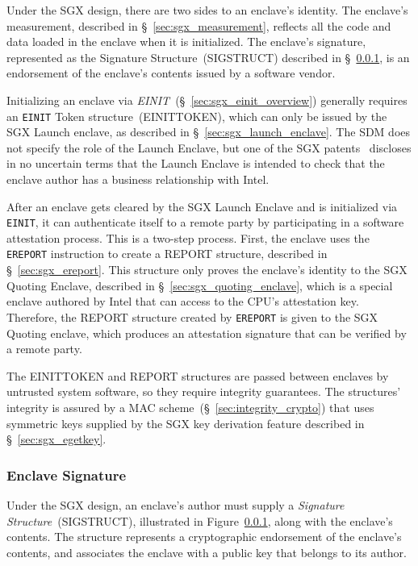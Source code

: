 Under the SGX design, there are two sides to an enclave's identity. The
enclave's measurement, described in \S~\ref{sec:sgx_measurement}, reflects all
the code and data loaded in the enclave when it is initialized. The enclave's
signature, represented as the Signature Structure~(SIGSTRUCT) described in
\S~\ref{sec:sgx_sigstruct}, is an endorsement of the enclave's contents issued
by a software vendor.

Initializing an enclave via \textit{EINIT}~(\S~\ref{sec:sgx_einit_overview})
generally requires an \texttt{EINIT} Token structure~(EINITTOKEN), which can
only be issued by the SGX Launch enclave, as described in
\S~\ref{sec:sgx_launch_enclave}. The SDM does not specify the role of the
Launch Enclave, but one of the SGX patents~\cite{intel2013patent1} discloses in
no uncertain terms that the Launch Enclave is intended to check that the
enclave author has a business relationship with Intel.

After an enclave gets cleared by the SGX Launch Enclave and is initialized via
\texttt{EINIT}, it can authenticate itself to a remote party by participating
in a software attestation process. This is a two-step process. First, the
enclave uses the \texttt{EREPORT} instruction to create a REPORT structure,
described in \S~\ref{sec:sgx_ereport}. This structure only proves the enclave's
identity to the SGX Quoting Enclave, described in
\S~\ref{sec:sgx_quoting_enclave}, which is a special enclave authored by Intel
that can access to the CPU's attestation key. Therefore, the REPORT structure
created by \texttt{EREPORT} is given to the SGX Quoting enclave, which produces
an attestation signature that can be verified by a remote party.

The EINITTOKEN and REPORT structures are passed between enclaves by untrusted
system software, so they require integrity guarantees. The structures'
integrity is assured by a MAC scheme~(\S~\ref{sec:integrity_crypto}) that uses
symmetric keys supplied by the SGX key derivation feature described in
\S~\ref{sec:sgx_egetkey}.


\subsubsection{Enclave Signature}
\label{sec:sgx_sigstruct}
\label{sec:sgx_mrsigner}


Under the SGX design, an enclave's author must supply a
\textit{Signature Structure}~(SIGSTRUCT), illustrated in
Figure~\ref{sec:sgx_sigstruct}, along with the enclave's contents. The
structure represents a cryptographic endorsement of the enclave's contents, and
associates the enclave with a public key that belongs to its author.

